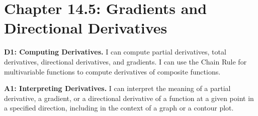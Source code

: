 \fancyhead[R]{\dayeleven}

\section*{\centering Chapter 14.5: Gradients and Directional Derivatives}

\textbf{D1: Computing Derivatives.} I can compute partial derivatives, total derivatives, directional derivatives, and gradients. I can use the Chain Rule for multivariable functions to compute derivatives of composite functions.

\textbf{A1: Interpreting Derivatives.} I can interpret the meaning of a partial derivative, a gradient, or a directional derivative of a function at a given point in a specified direction, including in the context of a graph or a contour plot.

